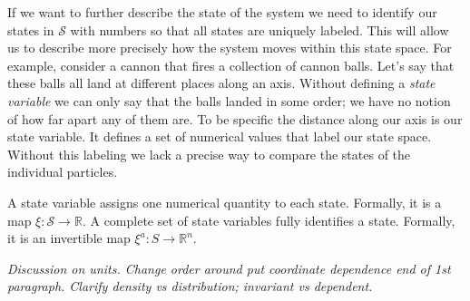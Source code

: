 \documentclass{article}
\begin{document}
	If we want to further describe the state of the system we need to identify our states in $\mathcal{S}$ with numbers so that all states are uniquely labeled. This will allow us to describe more precisely how the system moves within this state space. For example, consider a cannon that fires a collection of cannon balls. Let's say that these balls all land at different places along an axis. Without defining a \textit{state variable} we can only say that the balls landed in some order; we have no notion of how far apart any of them are. To be specific the distance along our axis is our state variable. It defines a set of numerical values that label our state space. Without this labeling we lack a precise way to compare the states of the individual particles.

\begin{defn}
	A state variable assigns one numerical quantity to each state. Formally, it is a map $\xi : \mathcal{S} \to \mathbb{R}$. A complete set of state variables fully identifies a state. Formally, it is an invertible  map $\xi^a : S \rightarrow \mathbb{R}^n $.
\end{defn}

\emph{Discussion on units. Change order around put coordinate dependence end of 1st paragraph. Clarify density vs distribution; invariant vs dependent.} 
	
\end{document}
